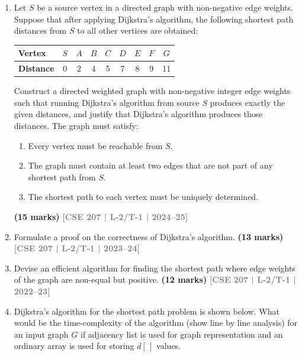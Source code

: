 \documentclass[12pt]{article}
\newcommand{\yr}[1]{\hfill\textcolor{gray}{\small\textbf{[#1]}}}
\newcommand{\mk}[1]{\textcolor{orange!70!black}{\small\textbf{(#1 marks)}}}
\begin{document}
\begin{enumerate}

  \item Let $S$ be a source vertex in a directed graph with non-negative edge weights. Suppose that after applying Dijkstra's algorithm, the following shortest path distances from $S$ to all other vertices are obtained:

    \begin{center}
      \begin{tabular}{l|cccccccc}
        \textbf{Vertex}   & $S$ & $A$ & $B$ & $C$ & $D$ & $E$ & $F$ & $G$ \\ \hline
        \textbf{Distance} & 0   & 2   & 4   & 5   & 7   & 8   & 9   & 11
      \end{tabular}
    \end{center}
    Construct a directed weighted graph with non-negative integer edge weights such that running Dijkstra's algorithm from source $S$ produces exactly the given distances, and justify that Dijkstra's algorithm produces those distances. The graph must satisfy:

    \begin{enumerate}
      \item Every vertex must be reachable from $S$.
      \item The graph must contain at least two edges that are not part of any shortest path from $S$.
      \item The shortest path to each vertex must be uniquely determined.
    \end{enumerate}

    \mk{15} \yr{CSE 207 | L-2/T-1 | 2024--25}


  \item Formulate a proof on the correctness of Dijkstra's algorithm.
    \mk{13} \yr{CSE 207 | L-2/T-1 | 2023--24}


  \item Devise an efficient algorithm for finding the shortest path where edge weights of the graph are non-equal but positive.
    \mk{12} \yr{CSE 207 | L-2/T-1 | 2022--23}


  \item Dijkstra's algorithm for the shortest path problem is shown below. What would be the time-complexity of the algorithm (show line by line analysis) for an input graph $G$ if adjacency list is used for graph representation and an ordinary array is used for storing $d[\,]$ values.


\end{enumerate}
\end{document}
